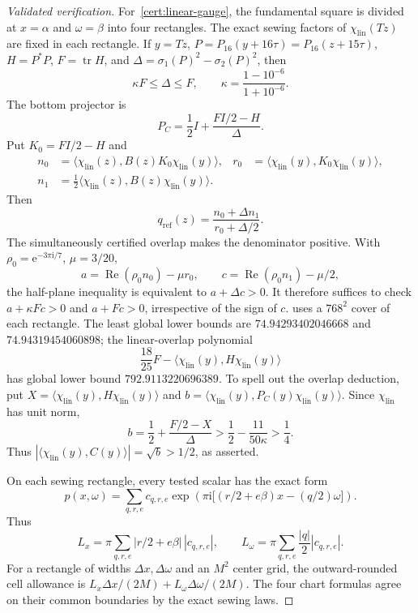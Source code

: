 \documentclass[10pt,a4paper]{amsart}
\numberwithin{equation}{section}
\newcommand{\ip}[2]{\langle #1,#2\rangle}
\newcommand{\e}{\mathrm e}
\newcommand{\ii}{\mathrm i}
\begin{document}
\begin{proof}[Validated verification]
For~\ref{cert:linear-gauge}, the fundamental square is divided at
$x=\alpha$ and $\omega=\beta$ into four rectangles.  The exact sewing factors
of $\chi_{\mathrm{lin}}(Tz)$ are fixed in each rectangle.  If
$y=Tz$, $P=P_{16}(y+16\tau)=P_{16}(z+15\tau)$,
$H=P^*P$, $F=\operatorname{tr}H$, and
$\Delta=\sigma_1(P)^2-\sigma_2(P)^2$, then
\begin{equation}\label{eq:Delta-range}
 \kappa F\le\Delta\le F,\qquad
 \kappa=\frac{1-10^{-6}}{1+10^{-6}}.
\end{equation}
The bottom projector is
\[
 P_C=\frac12I+\frac{FI/2-H}{\Delta}.
\]
Put $K_0=FI/2-H$ and
\[
\begin{aligned}
 n_0&=\ip{\chi_{\mathrm{lin}}(z)}
 {B(z)K_0\chi_{\mathrm{lin}}(y)},&
 r_0&=\ip{\chi_{\mathrm{lin}}(y)}
 {K_0\chi_{\mathrm{lin}}(y)},\\
 n_1&=\frac12\ip{\chi_{\mathrm{lin}}(z)}
 {B(z)\chi_{\mathrm{lin}}(y)}.
\end{aligned}
\]
Then
\[
 q_{\mathrm{ref}}(z)=
 \frac{n_0+\Delta n_1}{r_0+\Delta/2}.
\]
The simultaneously certified overlap makes the denominator positive.  With
$\rho_0=\e^{-3\pi\ii/7}$, $\mu=3/20$,
\[
 a=\operatorname{Re}(\rho_0n_0)-\mu r_0,\qquad
 c=\operatorname{Re}(\rho_0n_1)-\mu/2,
\]
the half-plane inequality is equivalent to $a+\Delta c>0$.  It therefore
suffices to check $a+\kappa Fc>0$ and $a+Fc>0$, irrespective of the sign of
$c$.
 uses a $768^2$ cover of each
rectangle.  The least global lower bounds are
$74.94293402046668$ and $74.94319454060898$; the linear-overlap polynomial
\[
 \frac{18}{25}F-
 \ip{\chi_{\mathrm{lin}}(y)}{H\chi_{\mathrm{lin}}(y)}
\]
has global lower bound $792.9113220696389$.
To spell out the overlap deduction, put
$X=\ip{\chi_{\mathrm{lin}}(y)}{H\chi_{\mathrm{lin}}(y)}$ and
$b=\ip{\chi_{\mathrm{lin}}(y)}
{P_C(y)\chi_{\mathrm{lin}}(y)}$.  Since $\chi_{\mathrm{lin}}$ has unit norm,
\[
 b=\frac12+\frac{F/2-X}{\Delta}
 >\frac12-\frac{11}{50\kappa}>\frac14.
\]
Thus $|\ip{\chi_{\mathrm{lin}}(y)}{C(y)}|=\sqrt b>1/2$, as asserted.

On each sewing rectangle, every tested scalar has the exact form
\[
 p(x,\omega)=\sum_{q,r,e}c_{q,r,e}
 \exp\!\left(\pi\ii\bigl[(r/2+e\beta)x-(q/2)\omega\bigr]\right).
\]
Thus
\[
 L_x=\pi\sum_{q,r,e}|r/2+e\beta|\,|c_{q,r,e}|,\qquad
 L_\omega=\pi\sum_{q,r,e}\frac{|q|}{2}|c_{q,r,e}|.
\]
For a rectangle of widths $\Delta x,\Delta\omega$ and an $M^2$ center grid,
the outward-rounded cell allowance is
$L_x\Delta x/(2M)+L_\omega\Delta\omega/(2M)$.  The four chart formulas agree
on their common boundaries by the exact sewing laws.


\end{proof}
\end{document}
